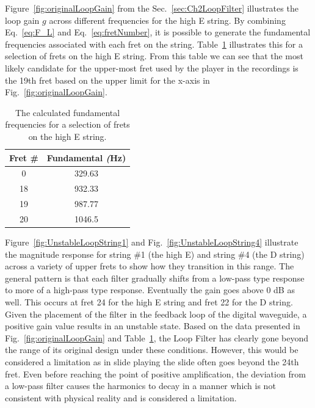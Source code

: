 \documentclass[../main.tex]{subfiles}
\begin{document}
Figure~\ref{fig:originalLoopGain} from the Sec.~\ref{sec:Ch2LoopFilter} illustrates the loop gain $g$ across different frequencies for the high E string. By combining Eq.~\ref{eq:F_L} and Eq.~\ref{eq:fretNumber}, it is possible to generate the fundamental frequencies associated with each fret on the string. Table~\ref{tab:eStringFrets} illustrates this for a selection of frets on the high E string. From this table we can see that the most likely candidate for the upper-most fret used by the player in the recordings is the 19th fret based on the upper limit for the x-axis in Fig.~\ref{fig:originalLoopGain}.

\begin{table}[h]
\centering
\begin{tabular}{|c| c|} 
 \hline
 \textbf{Fret \#} & \textbf{Fundamental} \emph(Hz) \\ [0.5ex] 
 \hline
 0 & 329.63\\
 18 & 932.33\\
 19 & 987.77\\
 20 & 1046.5\\
 \hline
\end{tabular}
\caption{The calculated fundamental frequencies for a selection of frets on the high E string.}
\label{tab:eStringFrets}
\end{table}

Figure~\ref{fig:UnstableLoopString1} and Fig.~\ref{fig:UnstableLoopString4} illustrate the magnitude response for string \#1 (the high E) and string \#4 (the D string) across a variety of upper frets to show how they transition in this range. The general pattern is that each filter gradually shifts from a low-pass type response to more of a high-pass type response. Eventually the gain goes above 0 dB as well. This occurs at fret 24 for the high E string and fret 22 for the D string. Given the placement of the filter in the feedback loop of the digital waveguide, a positive gain value results in an unstable state. Based on the data presented in Fig.~\ref{fig:originalLoopGain} and Table~\ref{tab:eStringFrets}, the Loop Filter has clearly gone beyond the range of its original design under these conditions. However, this would be considered a limitation as in slide playing the slide often goes beyond the 24th fret. Even before reaching the point of positive amplification, the deviation from a low-pass filter causes the harmonics to decay in a manner which is not consistent with physical reality and is considered a limitation. 
\end{document}
